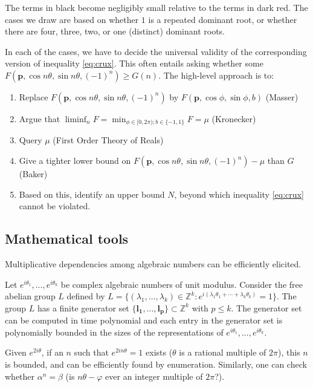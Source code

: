 The terms in black become negligibly small relative to the terms in dark red. The cases we draw are based on whether $1$ is a repeated dominant root, or whether there are four, three, two, or one (distinct) dominant roots.

In each of the cases, we have to decide the universal validity of the corresponding version of inequality \ref{eq:crux}. This often entails asking whether some $F(\mathbf{p}, \cos n\theta, \sin n\theta, (-1)^n) \ge G(n)$. The high-level approach is to:
\begin{enumerate}
\item Replace $F(\mathbf{p}, \cos n\theta, \sin n\theta, (-1)^n)$ by $F(\mathbf{p}, \cos \phi, \sin \phi, b)$ (Masser)
\item Argue that $\liminf_n F = \min_{\phi \in [0, 2\pi); b\in\{-1, 1\}} F = \mu$ (Kronecker)
\item Query $\mu$ (First Order Theory of Reals)
\item Give a tighter lower bound on $F(\mathbf{p}, \cos n\theta, \sin n\theta, (-1)^n) - \mu$ than $G$ (Baker) 
\item Based on this, identify an upper bound $N$, beyond which inequality \ref{eq:crux} cannot be violated.
\end{enumerate}

\subsection{Mathematical tools}
\label{arsenal}
Multiplicative dependencies among algebraic numbers can be efficiently elicited. 
 \begin{theorem}
  \label{thm:abelian}
  Let $e^{i \theta_1},...,e^{i \theta_k}$ be complex algebraic numbers of unit modulus. Consider the free abelian group $L$ defined by $L = \{(\lambda_1, \ldots ,\lambda_k) \in \mathbb{Z}^k: 
  e^{i (\lambda_1 \theta_1 + \cdots +  \lambda_k \theta_k)} = 1 \}$. 
  The group $L$ has a finite generator set $\{ \mathbf{l_1}, \ldots, \mathbf{l_p}\} \subset \mathbb{Z}^k$ with $p \le k$. The generator set can be computed in time polynomial and
  each entry in the generator set is polynomially bounded in the sizes of the representations of $e^{i \theta_1},...,e^{i \theta_k}$.
  \end{theorem}
 Given $e^{2i\theta}$, if an $n$ such that $e^{2i n \theta} = 1$ exists ($\theta$ is a rational multiple of $2\pi$), this $n$ is bounded, and can be efficiently found by enumeration. Similarly, one can check whether $\alpha^n = \beta$ (is $n\theta - \varphi$ ever an integer multiple of $2\pi$?). 
 
